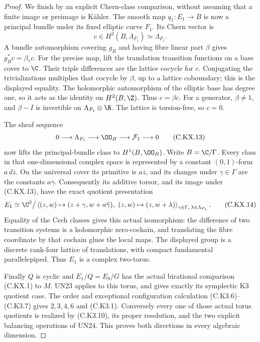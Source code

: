 \begin{proof}
We finish by an
explicit Chern-class
comparison, without
assuming that a
finite image or
preimage is
K\"ahler.
The smooth map
$q_1:E_1\to B$
is now a principal
bundle under its
fixed elliptic
curve $F_1$.
Its Chern vector is
\[
        c\in H^2(B,\Lambda_{F_1})
                  \simeq\Lambda_{F_1}.
                                                               \tag{C.KX.12}
\]
A bundle
automorphism
covering $g_B$
and having
fibre linear
part $\beta$
gives
$g_B^*c=\beta_*c$.
For the precise
map, lift the
translation
transition
functions on
a base cover
to $\C$.
Their triple
differences are
the lattice
cocycle for $c$.
Conjugating the
trivializations
multiplies that
cocycle by $\beta$,
up to a lattice
coboundary; this
is the displayed
equality.
The holomorphic
automorphism of
the elliptic
base has degree
one, so it acts
as the identity
on $H^2(B,\Z)$.
Thus $c=\beta c$.
For a generator,
$\beta\ne1$, and
$\beta-I$ is
invertible on
$\Lambda_{F_1}
\otimes\R$.
The lattice is
torsion-free, so
$c=0$.

The sheaf sequence
\[
 0\longrightarrow\Lambda_{F_1}
 \longrightarrow\OO_B
 \longrightarrow\mathcal F_1
 \longrightarrow0
                                                               \tag{C.KX.13}
\]
now lifts the
principal-bundle
class to
$H^1(B,\OO_B)$.
Write $B=\C/\Gamma$.
Every class in
that one-dimensional
complex space
is represented
by a constant
$(0,1)$-form
$a\,d\overline z$.
On the universal
cover its
primitive is
$a\overline z$,
and its changes
under $\gamma\in\Gamma$
are the constants
$a\overline\gamma$.
Consequently its
additive torsor,
and its image
under (C.KX.13),
have the exact
quotient presentation
\[
 E_1\simeq
 \C^2\big/
 \left\langle
 (z,w)\mapsto
       (z+\gamma,w+a\overline\gamma),\
 (z,w)\mapsto(z,w+\lambda)
 \right\rangle_{
       \gamma\in\Gamma,\,
       \lambda\in\Lambda_{F_1}} .
                                                               \tag{C.KX.14}
\]
Equality of the
Cech classes gives
this actual
isomorphism:
the difference
of two transition
systems is a
holomorphic
zero-cochain,
and translating
the fibre
coordinate by
that cochain
glues the local
maps.
The displayed
group is a
discrete rank-four
lattice of
translations,
with compact
fundamental
parallelepiped.
Thus $E_1$
is a complex
two-torus.

Finally $Q$ is
cyclic and
$E_1/Q=E_0/G$
has the actual
birational
comparison
(C.KX.1) to $M$.
UN23 applies
to this torus,
and gives
exactly its
symplectic K3
quotient case.
The order and
exceptional
configuration
calculation
(C.K3.6)--(C.K3.7)
gives $2,3,4,6$
and (C.K3.1).
Conversely every
one of those
actual torus
quotients is
realized by
(C.K3.10), its
proper resolution,
and the two
explicit balancing
operations of
UN24. This
proves both
directions in
every algebraic
dimension.
\end{proof}
